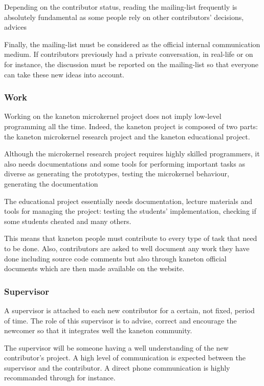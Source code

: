 Depending on the contributor status, reading the mailing-list frequently is
absolutely fundamental as some people rely on other contributors' decisions,
advices \etc{}

Finally, the mailing-list must be considered as the official internal
communication medium. If contributors previously had a private conversation,
in real-life or on  for instance, the discussion must be reported
on the mailing-list so that everyone can take these new ideas into account.


\subsubsection{Work}

Working on the kaneton microkernel project does not imply low-level programming
all the time. Indeed, the kaneton project is composed of two parts: the
kaneton microkernel research project and the kaneton educational project.

Although the microkernel research project requires highly skilled programmers,
it also needs documentations and some tools for performing important tasks as
diverse as generating the prototypes, testing the microkernel behaviour,
generating the documentation \etc{}

The educational project essentially needs documentation, lecture materials
and tools for managing the project: testing the students' implementation,
checking if some students cheated and many others.

This means that kaneton people must contribute to every type of task
that need to be done. Also, contributors are asked to well document
any work they have done including source code comments but also through
kaneton official documents which are then made available on the website.


\subsubsection{Supervisor}

A supervisor is attached to each new contributor for a certain, not fixed,
period of time. The role of this supervisor is to advise, correct and
encourage the newcomer so that it integrates well the kaneton community.

The supervisor will be someone having a well understanding of the new
contributor's project. A high level of communication is expected between
the supervisor and the contributor. A direct phone communication is highly
recommanded through  for instance.

